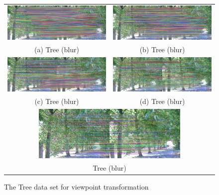 \begin{figure}[H]  
\begin{tabular}{cc}
  \includegraphics[width=75mm]{figures/tree_final_1_2} &  \includegraphics[width=75mm]{figures/tree_final_1_3} \\
(a) Tree (blur) & (b) Tree (blur) \\[6pt]
  \includegraphics[width=75mm]{figures/tree_final_1_4} &  \includegraphics[width=75mm]{figures/tree_final_1_5} \\
(c) Tree (blur) & (d) Tree (blur) \\[6pt]
  \multicolumn{2}{c}{\includegraphics[width=75mm]{figures/tree_final_1_6}} \\
  \multicolumn{2}{c}{Tree (blur) }\\[6pt]
\end{tabular}
\caption{The Tree data set for viewpoint transformation}\label{fig:epipolar_matching_tree}
\end{figure}

